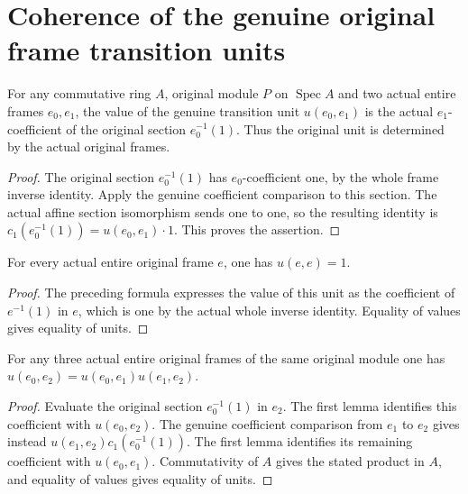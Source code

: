 \section{Coherence of the genuine original frame transition units}

\begin{lemma}\label{lem:fc-original-frame-transition-unit-value}
\leanok
{}
For any commutative ring $A$, original module $P$ on
$\operatorname{Spec}A$ and two actual entire frames $e_0,e_1$, the
value of the genuine transition unit $u(e_0,e_1)$ is the actual
$e_1$-coefficient of the original section $e_0^{-1}(1)$.
Thus the original unit is determined by the actual original frames.
\end{lemma}
\begin{proof}
The original section $e_0^{-1}(1)$ has $e_0$-coefficient one,
by the whole frame inverse identity. Apply the genuine coefficient
comparison to this section. The actual affine section isomorphism
sends one to one, so the resulting identity is
$c_1(e_0^{-1}(1))=u(e_0,e_1)\cdot1$. This proves the assertion.
\end{proof}

\begin{lemma}\label{lem:fc-original-frame-transition-unit-self}
\leanok
{}
For every actual entire original frame $e$, one has $u(e,e)=1$.
\end{lemma}
\begin{proof}
The preceding formula expresses the value of this unit as the
coefficient of $e^{-1}(1)$ in $e$, which is one by the actual
whole inverse identity. Equality of values gives equality of units.
\end{proof}

\begin{lemma}\label{lem:fc-original-frame-transition-unit-composition}
\leanok
{}
For any three actual entire original frames of the same original
module one has
$u(e_0,e_2)=u(e_0,e_1)u(e_1,e_2)$.
\end{lemma}
\begin{proof}
Evaluate the original section $e_0^{-1}(1)$ in $e_2$. The first
lemma identifies this coefficient with $u(e_0,e_2)$. The genuine
coefficient comparison from $e_1$ to $e_2$ gives instead
$u(e_1,e_2)c_1(e_0^{-1}(1))$. The first lemma identifies its remaining
coefficient with $u(e_0,e_1)$. Commutativity of $A$ gives the stated
product in $A$, and equality of values gives equality of units.
\end{proof}

